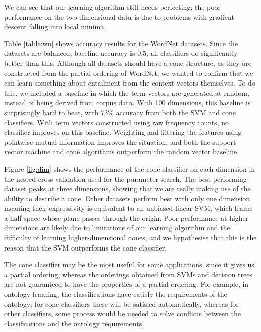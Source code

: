 We can see that our learning algorithm still needs perfecting; the
poor performance on the two dimensional data is due to problems with
gradient descent falling into local minima.

Table \ref{table:wn} shows accuracy results for the WordNet
datasets. Since the datasets are balanced, baseline accuracy is 0.5;
all classifiers do significantly better than this. Although all
datasets should have a cone structure, as they are constructed from
the partial ordering of WordNet, we wanted to confirm that we can
learn something about entailment from the context vectors
themselves. To do this, we included a baseline in which the term
vectors are generated at random, instead of being derived from corpus
data. With 100 dimensions, this baseline is surprisingly hard to beat,
with 73\% accuracy from both the SVM and cone classifiers. With term
vectors constructed using raw frequency counts, no classifier improves
on this baseline. Weighting and filtering the features using pointwise
mutual information improves the situation, and both the support vector
machine and cone algorithms outperform the random vector baseline.

Figure \ref{fig:dim} shows the performance of the cone classifier on
each dimension in the nested cross validation used for the parameter
search. The best performing dataset peaks at three dimensions, showing
that we are really making use of the ability to describe a cone. Other
datasets perform best with only one dimension, meaning their
expressivity is equivalent to an unbiased linear SVM, which learns a
half-space whose plane passes through the origin. Poor performance at
higher dimensions are likely due to limitations of our learning
algorithm and the difficulty of learning higher-dimensional cones, and
we hypothesise that this is the reason that the SVM outperforms the
cone classifier.

The cone classifier may be the most useful for some applications,
since it gives us a partial ordering, whereas the orderings obtained
from SVMs and decision trees are not guaranteed to have the properties
of a partial ordering. For example, in ontology learning, the
classifications have satisfy the requirements of the ontology; for
cone classifiers these will be satisied automatically, whereas for
other classifiers, some process would be needed to solve conflicts
between the classifications and the ontology requirements.
